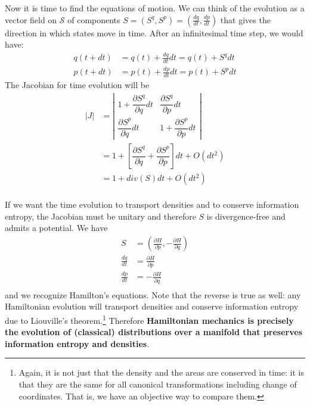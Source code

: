 \documentclass[11pt]{article}
\begin{document}
Now it is time to find the equations of motion. We can think of the evolution as a vector field on $\mathcal{S}$ of components $S = (S^q, S^p) = (\frac{dq}{dt}, \frac{dp}{dt})$ that gives the direction in which states move in time. After an infinitesimal time step, we would have:
\begin{equation}
\begin{aligned}
q(t+dt) &= q(t) + \frac{dq}{dt} dt = q(t) + S^q dt \\
p(t+dt) &= p(t) + \frac{dp}{dt} dt = p(t) + S^p dt
\end{aligned}
\end{equation}
The Jacobian for time evolution will be
\begin{equation}
\label{Jacobian_evolution}
\begin{aligned}
|J| &= \left| \begin{matrix}
1 + \dfrac{\partial S^q}{\partial q}dt & \dfrac{\partial S^q}{\partial p} dt \\[2.2ex]
\dfrac{\partial S^p}{\partial q}  dt & 1 + \dfrac{\partial S^p}{\partial p} dt \end{matrix} \right| \\
&= 1 + \left[ \dfrac{\partial S^q}{\partial q} + \dfrac{\partial S^p}{\partial p} \right]dt + O(dt^2)\\
&= 1 + div(S)dt + O(dt^2)\\
\end{aligned}
\end{equation}

If we want the time evolution to transport  densities and to conserve information entropy, the Jacobian must be unitary and therefore $S$ is divergence-free and admits a potential. We have
\begin{equation}
\label{Potential_Hamilton}
\begin{aligned}
S &= \left(\frac{\partial H}{\partial p}, - \frac{\partial H}{\partial q}\right) \\
\frac{dq}{dt} &= \frac{\partial H}{\partial p}  \\
\frac{dp}{dt} &= - \frac{\partial H}{\partial q}  \\
\end{aligned}
\end{equation}
and we recognize Hamilton's equations. Note that the reverse is true as well: any Hamiltonian evolution will transport densities and conserve information entropy due to Liouville's theorem.\footnote{Again, it is not just that the density and the areas are conserved in time: it is that they are the same for all canonical transformations including change of coordinates. That is, we have an objective way to compare them.} Therefore \textbf{Hamiltonian mechanics is precisely the evolution of (classical) distributions over a manifold that preserves information entropy and densities}.
\end{document}
